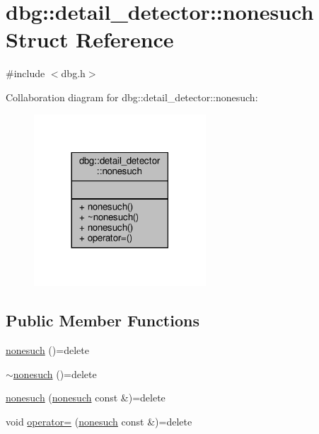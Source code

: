 \hypertarget{structdbg_1_1detail__detector_1_1nonesuch}{}\section{dbg\+:\+:detail\+\_\+detector\+:\+:nonesuch Struct Reference}
\label{structdbg_1_1detail__detector_1_1nonesuch}


{\ttfamily \#include $<$dbg.\+h$>$}



Collaboration diagram for dbg\+:\+:detail\+\_\+detector\+:\+:nonesuch\+:\nopagebreak
\begin{figure}[H]
\begin{center}
\leavevmode
\includegraphics[width=182pt]{d6/df5/structdbg_1_1detail__detector_1_1nonesuch__coll__graph}
\end{center}
\end{figure}
\subsection*{Public Member Functions}
\begin{DoxyCompactItemize}
\item 
\hyperlink{structdbg_1_1detail__detector_1_1nonesuch_af18fc7da3a412a23ac293cba85bf322b}{nonesuch} ()=delete
\item 
\hyperlink{structdbg_1_1detail__detector_1_1nonesuch_aae35d90996534c096275383b71c797b7}{$\sim$nonesuch} ()=delete
\item 
\hyperlink{structdbg_1_1detail__detector_1_1nonesuch_a82c9bfc90b56b542819d8df5af7cebe6}{nonesuch} (\hyperlink{structdbg_1_1detail__detector_1_1nonesuch}{nonesuch} const \&)=delete
\item 
void \hyperlink{structdbg_1_1detail__detector_1_1nonesuch_af0d1b2ab32ace678e2c9d95684d1917b}{operator=} (\hyperlink{structdbg_1_1detail__detector_1_1nonesuch}{nonesuch} const \&)=delete
\end{DoxyCompactItemize}


